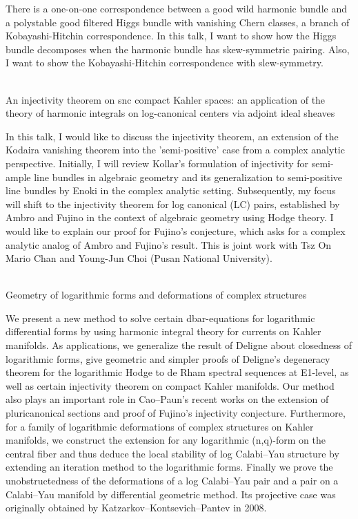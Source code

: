 \documentclass[dvipdfmx,a4paper,12pt]{article}
\theoremstyle{plain} %
\theoremstyle{definition} %
\begin{document}
\vskip3mm
There is a one-on-one correspondence between a good wild harmonic bundle and a polystable good filtered Higgs bundle with vanishing Chern classes, a branch of Kobayashi-Hitchin correspondence.  In this talk, I want to show how the  Higgs bundle decomposes when the harmonic bundle has skew-symmetric pairing. Also, I want to show the Kobayashi-Hitchin correspondence with slew-symmetry.
\vskip6mm

\\
An injectivity theorem on snc compact Kahler spaces:
an application of the theory of harmonic integrals on log-canonical centers via adjoint ideal sheaves


\vskip3mm
In this talk, I would like to discuss the injectivity theorem, an extension of the Kodaira vanishing theorem into the 'semi-positive' case from a complex analytic perspective.
Initially, I will review Kollar's formulation of injectivity for semi-ample line bundles in algebraic geometry and its generalization to semi-positive line bundles by Enoki in the complex analytic setting. 
Subsequently, my focus will shift to the injectivity theorem for log canonical (LC) pairs, established by Ambro and Fujino in the context of algebraic geometry using Hodge theory.
I would like to explain our proof for Fujino's conjecture, which asks for a complex analytic analog of Ambro and Fujino's result.
This is joint work with Tsz On Mario Chan and Young-Jun Choi (Pusan National University).
\vskip6mm


\newpage

\vskip3mm

\\
Geometry of logarithmic forms and deformations of complex structures

\vskip3mm
 We present a new method to solve certain dbar-equations for logarithmic differential forms by using harmonic integral theory for currents on Kahler manifolds. As applications, we generalize the result of Deligne about closedness of logarithmic forms, give geometric and simpler proofs of Deligne's degeneracy theorem for the logarithmic Hodge to de Rham spectral sequences at E1-level, as well as certain injectivity theorem on compact Kahler manifolds. Our method also plays an important role in Cao--Paun's recent works on the extension of pluricanonical sections and proof of Fujino's injectivity conjecture. 
     Furthermore, for a family of logarithmic deformations of complex structures on Kahler manifolds, we construct the extension for any logarithmic (n,q)-form on the central fiber and thus deduce the local stability of log Calabi--Yau structure by extending an iteration method to the logarithmic forms. Finally we prove the unobstructedness of the deformations of a log Calabi--Yau pair and a pair on a Calabi--Yau manifold by differential geometric method. Its projective case was originally obtained by Katzarkov--Kontsevich--Pantev in 2008. 
\vskip6mm
\end{document}
